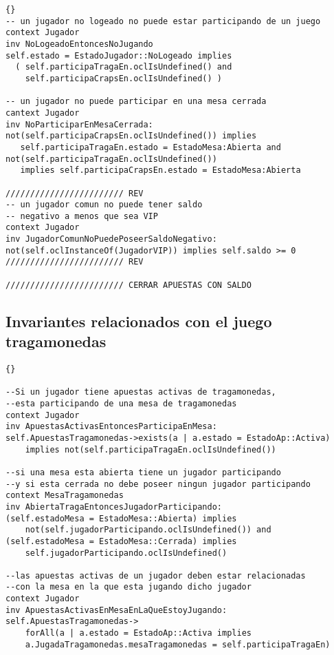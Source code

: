 \begin{framed}
\begin{lstlisting}[frame=trbl]{}
-- un jugador no logeado no puede estar participando de un juego
context Jugador
inv NoLogeadoEntoncesNoJugando
self.estado = EstadoJugador::NoLogeado implies 
  ( self.participaTragaEn.oclIsUndefined() and 
    self.participaCrapsEn.oclIsUndefined() )

-- un jugador no puede participar en una mesa cerrada
cantext Jugador
inv NoParticiparEnMesaCerrada:
not(self.participaCrapsEn.oclIsUndefined()) implies 
   self.participaTragaEn.estado = EstadoMesa:Abierta and
not(self.participaTragaEn.oclIsUndefined()) 
   implies self.participaCrapsEn.estado = EstadoMesa:Abierta
      
//////////////////////// REV
-- un jugador comun no puede tener saldo 
-- negativo a menos que sea VIP
context Jugador
inv JugadorComunNoPuedePoseerSaldoNegativo:
not(self.oclInstanceOf(JugadorVIP)) implies self.saldo >= 0
//////////////////////// REV

//////////////////////// CERRAR APUESTAS CON SALDO

\end{lstlisting}

\subsection{Invariantes relacionados con el juego tragamonedas}
\lstset{language=ocl}
\lstset{commentstyle=\textit}
\begin{lstlisting}[frame=trbl]{}

--Si un jugador tiene apuestas activas de tragamonedas,
--esta participando de una mesa de tragamonedas
context Jugador
inv ApuestasActivasEntoncesParticipaEnMesa:
self.ApuestasTragamonedas->exists(a | a.estado = EstadoAp::Activa)
    implies not(self.participaTragaEn.oclIsUndefined())

--si una mesa esta abierta tiene un jugador participando 
--y si esta cerrada no debe poseer ningun jugador participando
context MesaTragamonedas
inv AbiertaTragaEntoncesJugadorParticipando:
(self.estadoMesa = EstadoMesa::Abierta) implies 
    not(self.jugadorParticipando.oclIsUndefined()) and
(self.estadoMesa = EstadoMesa::Cerrada) implies 
    self.jugadorParticipando.oclIsUndefined()

--las apuestas activas de un jugador deben estar relacionadas 
--con la mesa en la que esta jugando dicho jugador
context Jugador
inv ApuestasActivasEnMesaEnLaQueEstoyJugando:
self.ApuestasTragamonedas->
    forAll(a | a.estado = EstadoAp::Activa implies 
    a.JugadaTragamonedas.mesaTragamonedas = self.participaTragaEn)


\end{lstlisting}
\end{framed}
